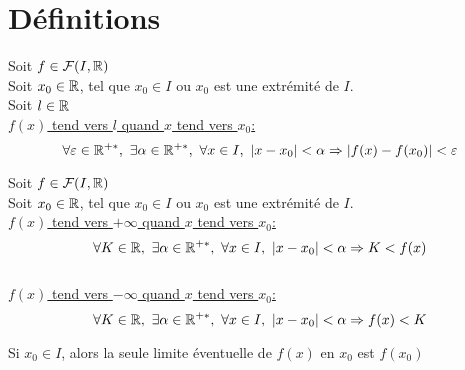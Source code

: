 \documentclass[12pt,twoside,a4paper]{article}
\author{MPSI 2}
\begin{document}
	\maketitle
	\section{D\'efinitions}
		\begin{defi}
			Soit $f\in\mathcal{F}(I,\mathbb{R})$\\
			Soit $x_0\in\mathbb{R}$, tel que $x_0\in I$ ou $x_0$ est une extr\'emit\'e de $I$.\\
			Soit $l\in\mathbb{R}$\\
			\textbullet \underline{$f(x)$ tend vers $l$ quand $x$ tend vers $x_0$:}
			$$\forall \varepsilon\in\mathbb{R}^{+*},\ \exists \alpha \in \mathbb{R}^{+*},\ \forall x\in I,\ \left|x-x_0 \right|<\alpha \Rightarrow \left| f(x)-f(x_0)\right| <\varepsilon$$
		\end{defi}
		\begin{defi}
			Soit $f\in\mathcal{F}(I,\mathbb{R})$\\
			Soit $x_0\in\mathbb{R}$, tel que $x_0\in I$ ou $x_0$ est une extr\'emit\'e de $I$.\\
			\textbullet \underline{$f(x)$ tend vers $+\infty$ quand $x$ tend vers $x_0$:}
			$$\forall K\in\mathbb{R},\ \exists \alpha \in \mathbb{R}^{+*},\ \forall x\in I,\ \left|x-x_0 \right|<\alpha \Rightarrow K<f(x)$$\\
			\textbullet \underline{$f(x)$ tend vers $-\infty$ quand $x$ tend vers $x_0$:}
			$$\forall K\in\mathbb{R},\ \exists \alpha \in \mathbb{R}^{+*},\ \forall x\in I,\ \left|x-x_0 \right|<\alpha \Rightarrow f(x)<K$$
		\end{defi}
		\begin{prop}
			Si $x_0\in I$, alors la seule limite \'eventuelle de $f(x)$ en $x_0$ est $f(x_0)$
		\end{prop}
\end{document}
